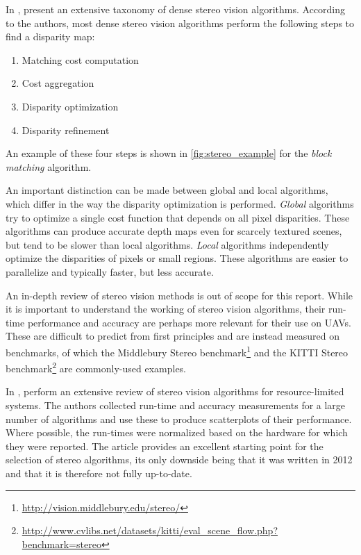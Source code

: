 In \cite{Scharstein2002}, \citeauthor{Scharstein2002} present an extensive taxonomy of dense stereo vision algorithms.
According to the authors, most dense stereo vision algorithms perform the following steps to find a disparity map:
\begin{enumerate}
\item Matching cost computation
\item Cost aggregation
\item Disparity optimization
\item Disparity refinement
\end{enumerate}
An example of these four steps is shown in \autoref{fig:stereo_example} for the \emph{block matching} algorithm.

An important distinction can be made between global and local algorithms, which differ in the way the disparity optimization is performed.
\emph{Global} algorithms try to optimize a single cost function that depends on all pixel disparities.
These algorithms can produce accurate depth maps even for scarcely textured scenes, but tend to be slower than local algorithms.
\emph{Local} algorithms independently optimize the disparities of pixels or small regions.
These algorithms are easier to parallelize and typically faster, but less accurate.

\medskip

An in-depth review of stereo vision methods is out of scope for this report.
While it is important to understand the working of stereo vision algorithms, their run-time performance and accuracy are perhaps more relevant for their use on \acp{UAV}.
These are difficult to predict from first principles and are instead measured on benchmarks, of which the Middlebury Stereo benchmark\footnote{\url{http://vision.middlebury.edu/stereo/}} \cite{Scharstein2002} and the KITTI Stereo benchmark\footnote{\url{http://www.cvlibs.net/datasets/kitti/eval_scene_flow.php?benchmark=stereo}} \cite{Menze2015} are commonly-used examples.

In \cite{Tippetts2016}, \citeauthor{Tippetts2016} perform an extensive review of stereo vision algorithms for resource-limited systems.
The authors collected run-time and accuracy measurements for a large number of algorithms and use these to produce scatterplots of their performance.
Where possible, the run-times were normalized based on the hardware for which they were reported.
The article provides an excellent starting point for the selection of stereo algorithms, its only downside being that it was written in 2012 and that it is therefore not fully up-to-date.


